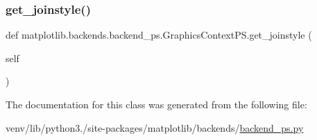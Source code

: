 \subsubsection{\texorpdfstring{get\+\_\+joinstyle()}{get\_joinstyle()}}
{\footnotesize\ttfamily def matplotlib.\+backends.\+backend\+\_\+ps.\+Graphics\+Context\+P\+S.\+get\+\_\+joinstyle (\begin{DoxyParamCaption}\item[{}]{self }\end{DoxyParamCaption})}



The documentation for this class was generated from the following file\+:\begin{DoxyCompactItemize}
\item 
venv/lib/python3./site-\/packages/matplotlib/backends/\hyperlink{backend__ps_8py}{backend\+\_\+ps.\+py}\end{DoxyCompactItemize}
